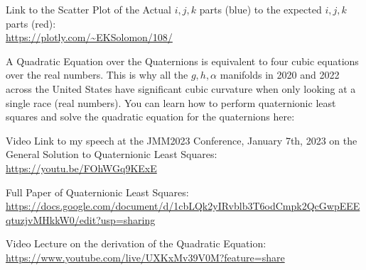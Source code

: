 Link to the Scatter Plot of the Actual $i,j,k$ parts (blue) to the expected $i,j,k$ parts (red):\\
\url{https://plotly.com/~EKSolomon/108/}

A Quadratic Equation over the Quaternions is equivalent to four cubic equations over the real numbers. This is why all the $g,h,\alpha$ manifolds in 2020 and 2022 across the United States have significant cubic curvature when only looking at a single race (real numbers). You can learn how to perform quaternionic least squares and solve the quadratic equation for the quaternions here:

Video Link to my speech at the JMM2023 Conference, January 7th, 2023 on the General Solution to Quaternionic Least Squares:\\
\url{https://youtu.be/FOhWGq9KExE}

Full Paper of Quaternionic Least Squares:\\
\url{https://docs.google.com/document/d/1cbLQk2yIRvblb3T6odCmpk2QcGwpEEEqtuzjvMHkkW0/edit?usp=sharing}

Video Lecture on the derivation of the Quadratic Equation:\\
\url{https://www.youtube.com/live/UXKxMv39V0M?feature=share}

